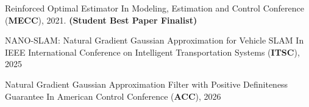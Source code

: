 \begin{publist}
        {Reinforced Optimal Estimator}
        {In Modeling, Estimation and Control Conference (\textbf{MECC}), 2021. \textbf{(Student Best Paper Finalist)}}
        {
         }

        {NANO-SLAM: Natural Gradient Gaussian Approximation for Vehicle SLAM}
        {In IEEE International Conference on Intelligent Transportation Systems (\textbf{ITSC}), 2025}
        {}

        {Natural Gradient Gaussian Approximation Filter with Positive Definiteness Guarantee}
        {In American Control Conference (\textbf{ACC}), 2026}
        {}

\end{publist}
